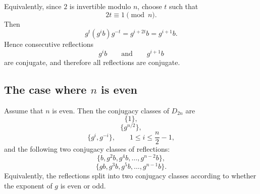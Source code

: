 \begin{remark}
Equivalently, since $2$ is invertible modulo $n$, choose $t$ such that
\[
    2t\equiv 1\pmod n.
\]
Then
\[
    g^t(g^i b)g^{-t}
    =
    g^{i+2t}b
    =
    g^{i+1}b.
\]
Hence consecutive reflections
\[
    g^i b
    \qquad\text{and}\qquad
    g^{i+1}b
\]
are conjugate, and therefore all reflections are conjugate.
\end{remark}

\subsection{The case where \texorpdfstring{$n$}{n} is even}

\begin{theorem}
    Assume that $n$ is even. Then the conjugacy classes of $D_{2n}$ are
    \[
        \{1\},
    \]
    \[
        \{g^{n/2}\},
    \]
    \[
        \{g^i,g^{-i}\},
        \qquad
        1\leq i\leq \frac n2-1,
    \]
    and the following two conjugacy classes of reflections:
    \[
        \{b,g^2b,g^4b,\ldots,g^{n-2}b\},
    \]
    \[
        \{gb,g^3b,g^5b,\ldots,g^{n-1}b\}.
    \]
    Equivalently, the reflections split into two conjugacy classes according to whether the exponent of $g$ is even or odd.
    \end{theorem}
    
